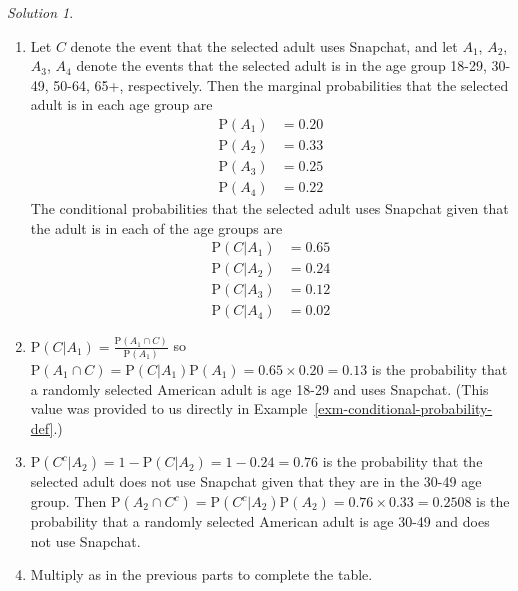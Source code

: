 \documentclass[
  letterpaper,
  DIV=11,
  numbers=noendperiod]{scrreprt}
\theoremstyle{plain}
\theoremstyle{definition}
\theoremstyle{definition}
\theoremstyle{definition}
\theoremstyle{remark}
\newtheorem{refsolution}{Solution}[chapter]
\begin{document}
\begin{tcolorbox}[enhanced jigsaw, opacityback=0, rightrule=.15mm, coltitle=black, colframe=quarto-callout-tip-color-frame, toprule=.15mm, colbacktitle=quarto-callout-tip-color!10!white, opacitybacktitle=0.6, left=2mm, toptitle=1mm, breakable, title={Solution (click to expand)}, bottomtitle=1mm, colback=white, leftrule=.75mm, titlerule=0mm, arc=.35mm, bottomrule=.15mm]

\begin{refsolution}
\leavevmode

\begin{enumerate}
\def\labelenumi{\arabic{enumi}.}
\item
  Let \(C\) denote the event that the selected adult uses Snapchat, and
  let \(A_1\), \(A_2\), \(A_3\), \(A_4\) denote the events that the
  selected adult is in the age group 18-29, 30-49, 50-64, 65+,
  respectively. Then the marginal probabilities that the selected adult
  is in each age group are \begin{align*}
  \textrm{P}(A_1) & = 0.20\\
  \textrm{P}(A_2) & = 0.33\\
  \textrm{P}(A_3) & = 0.25\\
  \textrm{P}(A_4) & = 0.22
  \end{align*} The conditional probabilities that the selected adult
  uses Snapchat given that the adult is in each of the age groups are
  \begin{align*}
  \textrm{P}(C|A_1) & = 0.65\\
  \textrm{P}(C|A_2) & = 0.24\\
  \textrm{P}(C|A_3) & = 0.12\\
  \textrm{P}(C|A_4) & = 0.02
  \end{align*}
\item
  \(\textrm{P}(C|A_1) = \frac{\textrm{P}(A_1 \cap C)}{\textrm{P}(A_1)}\)
  so
  \(\textrm{P}(A_1 \cap C) = \textrm{P}(C|A_1)\textrm{P}(A_1) = 0.65\times 0.20 = 0.13\)
  is the probability that a randomly selected American adult is age
  18-29 and uses Snapchat. (This value was provided to us directly in
  Example~\ref{exm-conditional-probability-def}.)
\item
  \(\textrm{P}(C^c|A_2) = 1 - \textrm{P}(C|A_2) = 1 - 0.24 = 0.76\) is
  the probability that the selected adult does not use Snapchat given
  that they are in the 30-49 age group. Then
  \(\textrm{P}(A_2 \cap C^c) = \textrm{P}(C^c|A_2)\textrm{P}(A_2) = 0.76 \times 0.33 = 0.2508\)
  is the probability that a randomly selected American adult is age
  30-49 and does not use Snapchat.
\item
  Multiply as in the previous parts to complete the table.


\end{enumerate}
\end{refsolution}
\end{tcolorbox}
\end{document}

